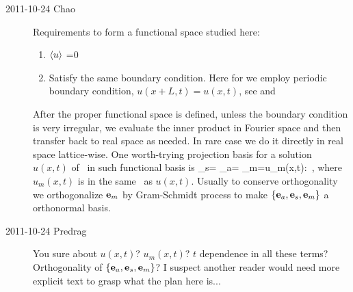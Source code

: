 \begin{description}
\item[2011-10-24 Chao] Requirements to form a functional space studied
here:
      \begin{enumerate}
        \item $\left\langle {u} \right\rangle$ =0
        \item Satisfy the same boundary condition. Here for \KSe we employ
        periodic boundary condition, $u(x+L,t)=u(x,t)$, see
        and 
       \end{enumerate}
After the proper functional space is defined, unless the boundary
condition is very irregular, we evaluate the inner product
 in Fourier space and then transfer back to real
space as needed. In rare case we do it directly in real space
lattice-wise. One worth-trying projection basis  for a
solution $u(x,t)$ of \KSe\ in such functional basis is
  \beq \be_s=\eeq
  \beq \be_a=\eeq
  \beq \be_m=u_m(x,t): \max {}
        \,,
where $u_m(x,t)$ is in the same \rpo\ as $u(x,t)$. Usually to conserve
orthogonality we orthogonalize ${\bf e}_m$ by Gram-Schmidt process to make
$\{{\bf e}_a, {\bf e}_s, {\bf e}_m\}$ a orthonormal basis.

\item[2011-10-24 Predrag] You sure about $u(x,t)$? $u_m(x,t)$? $t$
dependence in all these terms? Orthogonality of $\{{\bf e}_a, {\bf e}_s,
{\bf e}_m\}$? I suspect another reader would need more explicit text to grasp
what the plan here is...


\end{description}
